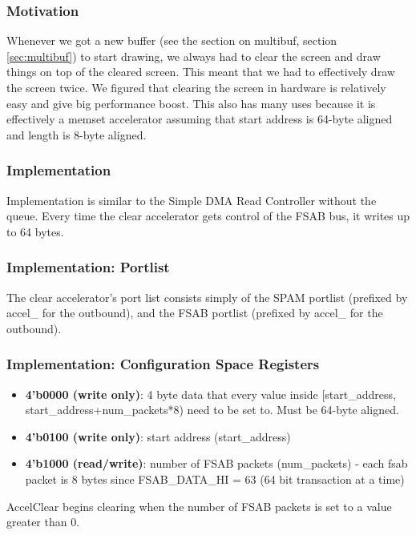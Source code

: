 \documentclass[10pt]{article}
\begin{document}
\subsubsection{Motivation}

Whenever we got a new buffer (see the section on multibuf, section
\ref{sec:multibuf}) to start drawing, we always had to clear the screen and
draw things on top of the cleared screen.  This meant that we had to
effectively draw the screen twice.  We figured that clearing the screen in
hardware is relatively easy and give big performance boost.  This also has
many uses because it is effectively a memset accelerator assuming that start
address is 64-byte aligned and length is 8-byte aligned.

\subsubsection{Implementation}

Implementation is similar to the Simple DMA Read Controller without the
queue. Every time the clear accelerator gets control of the FSAB bus, it
writes up to 64 bytes.

\subsubsection{Implementation: Portlist}

The clear accelerator's port list consists simply of the SPAM portlist
(prefixed by accel\_ for the outbound), and the FSAB portlist (prefixed by
accel\_ for the outbound).

\subsubsection{Implementation: Configuration Space Registers}

\begin{itemize}
\item{\textbf{4'b0000 (write only)}: 4 byte data that every value inside
[start\_address, start\_address+num\_packets*8) need to be set to.  Must be
64-byte aligned.}
\item{\textbf{4'b0100 (write only)}: start address (start\_address)}
\item{\textbf{4'b1000 (read/write)}: number of FSAB packets (num\_packets) - each fsab
packet is 8 bytes since FSAB\_DATA\_HI = 63 (64 bit transaction at a time)}
\end{itemize}

AccelClear begins clearing when the number of FSAB packets is set to a value
greater than 0.
\end{document}
